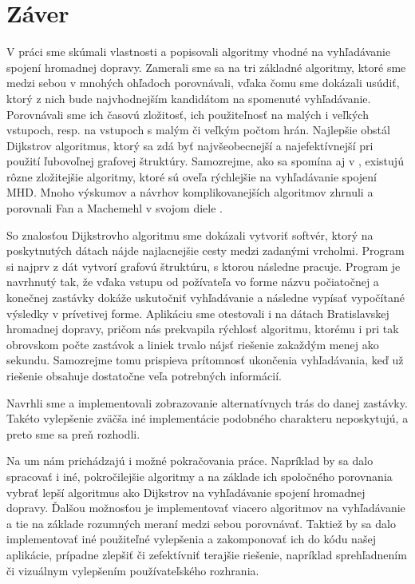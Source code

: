 \chapter*{Záver}  %

V práci sme skúmali vlastnosti a popisovali algoritmy vhodné na vyhľadávanie spojení hromadnej dopravy. Zamerali sme sa na tri základné algoritmy, ktoré sme medzi sebou v mnohých ohľadoch porovnávali, vďaka čomu sme dokázali usúdiť, ktorý z nich bude najvhodnejším kandidátom na spomenuté vyhľadávanie. Porovnávali sme ich časovú zložitosť, ich použiteľnosť na malých i veľkých vstupoch, resp. na vstupoch s malým či veľkým počtom hrán. Najlepšie obstál Dijkstrov algoritmus, ktorý sa zdá byť najvšeobecnejší a najefektívnejší pri použití ľubovoľnej grafovej štruktúry. Samozrejme, ako sa spomína aj v \cite{bast2010fast}, existujú rôzne zložitejšie algoritmy, ktoré sú oveľa rýchlejšie na vyhľadávanie spojení MHD. Mnoho výskumov a návrhov komplikovanejších algoritmov zhrnuli a porovnali Fan a Machemehl v svojom diele \cite{fan2004optimal}.

So znalosťou Dijkstrovho algoritmu sme dokázali vytvoriť softvér, ktorý na poskytnutých dátach nájde najlacnejšie cesty medzi zadanými vrcholmi. Program si najprv z dát vytvorí grafovú štruktúru, s ktorou následne pracuje. Program je navrhnutý tak, že vďaka vstupu od požívateľa vo forme názvu počiatočnej a konečnej zastávky dokáže uskutočniť vyhľadávanie a následne vypísať vypočítané výsledky v prívetivej forme. Aplikáciu sme otestovali i na dátach Bratislavskej hromadnej dopravy, pričom nás prekvapila rýchlosť algoritmu, ktorému i pri tak obrovskom počte zastávok a liniek trvalo nájsť riešenie zakaždým menej ako sekundu. Samozrejme tomu prispieva prítomnosť ukončenia vyhľadávania, keď už riešenie obsahuje dostatočne veľa potrebných informácií.

Navrhli sme a implementovali zobrazovanie alternatívnych trás do danej zastávky. Takéto vylepšenie zväčša iné implementácie podobného charakteru neposkytujú, a preto sme sa preň rozhodli.

Na um nám prichádzajú i možné pokračovania práce. Napríklad by sa dalo spracovať i iné, pokročilejšie algoritmy a na základe ich spoločného porovnania vybrať lepší algoritmus ako Dijkstrov na vyhľadávanie spojení hromadnej dopravy. Ďalšou možnosťou je implementovať viacero algoritmov na vyhľadávanie a tie na základe rozumných meraní medzi sebou porovnávať. Taktiež by sa dalo implementovať iné použiteľné vylepšenia a zakomponovať ich do kódu našej aplikácie, prípadne zlepšiť či zefektívniť terajšie riešenie, napríklad sprehľadnením či vizuálnym vylepšením používateľského rozhrania.

